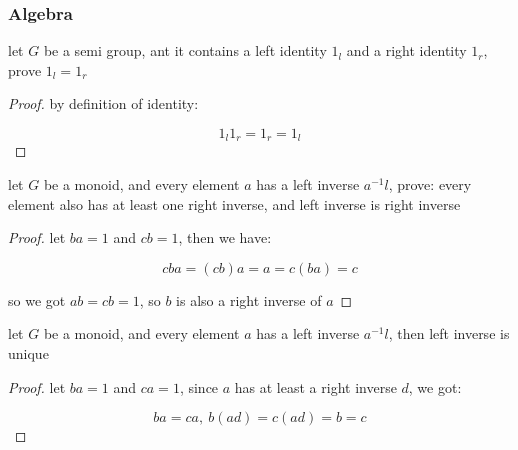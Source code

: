 \subsubsection{Algebra}

\begin{exercise}
    let $G$ be a semi group, ant it contains a left identity $1_l$ and a right identity $1_r$,
    prove $1_l = 1_r$
\end{exercise}

\begin{proof}
    by definition of identity:

    \[
        1_l 1_r = 1_r = 1_l
    \]
\end{proof}


\begin{exercise}
    let $G$ be a monoid, and every element $a$ has a left inverse $a^{-1}l$, 
    prove: every element also has at least one right inverse, and left inverse is right inverse
\end{exercise}

\begin{proof}
    let $ba = 1$ and $cb = 1$, then we have:

    \[
        cba=(cb)a = a = c(ba) = c
    \]

    so we got $ab = cb= 1 $, so $b$ is also a right inverse of $a$
\end{proof}

\begin{exercise}
   let $G$ be a monoid, and every element $a$ has a left inverse $a^{-1}l$, then left inverse is unique
\end{exercise}

\begin{proof}
    let $ba = 1$ and $ca= 1$, since $a$ has at least a right inverse $d$, we got:
    
    \[
        ba = ca,\: b(ad) = c(ad) = b  = c
    \]
\end{proof}